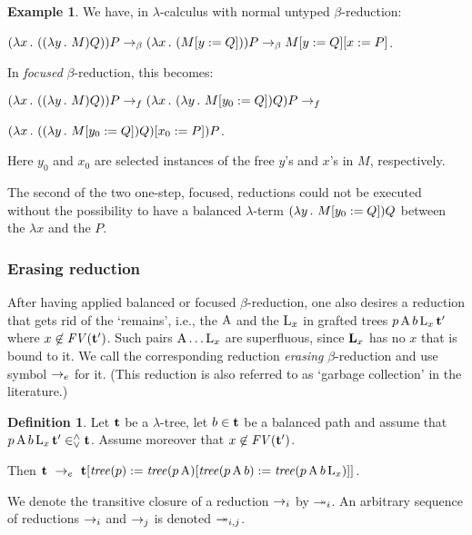 \documentclass{article}
\theoremstyle{plain}
\theoremstyle{definition}
\newtheorem{Def}[The]{Definition}
\newtheorem{Exa}[The]{Example}
\begin{document}
\begin{Exa}
We have, in $\lambda$-calculus with normal untyped $\beta$-reduction:

$(\lambda x  \, . \,\, ((\lambda y  \, . \,\, M) Q)) P \rightarrow_{\beta} (\lambda x  \, . \,\, (M[y := Q])) P \rightarrow_{\beta} M[y := Q][x := P]$.

In {\em focused\/} $\beta$-reduction, this becomes:

$(\lambda x \, . \,\, ((\lambda y  \, . \,\, M) Q)) P \rightarrow_f (\lambda x  \, . \,\, (\lambda y  \, . \,\, M[y_0 := Q])Q) P \rightarrow_f$

\mbox{$(\lambda x  \, . \,\, ((\lambda y  \, . \,\, M[y_0 := Q])Q)[x_0 := P])P$}.

Here $y_0$ and $x_0$ are selected instances of the free $y$'s and $x$'s in $M$, respectively.

The second of the two one-step, focused, reductions could not be executed without the possibility to have a balanced $\lambda$-term $(\lambda y  \, . \,\, M[y_0 := Q])Q$ between the $\lambda x$ and the $P$.

\end{Exa}


\subsubsection{Erasing reduction}

After having applied balanced or focused $\beta$-reduction, one also desires a reduction that gets rid of the `remains', i.e., the ${\rm A}$ and the ${\rm L}_x$ in grafted trees $p \, {\rm A} \, b \, {\rm L}_x \, {\bf t'}$ where $x \not \in {\it FV}({\bf t'})$. Such pairs ${\rm A} \ldots {\rm L}_x$ are superfluous, since ${\bf L}_x$ has no $x$ that is bound to it. We call the corresponding reduction {\em erasing\/} $\beta$-reduction and use symbol $\rightarrow_e$ for it. (This reduction is also referred to as `garbage collection' in the literature.)

\begin{Def}
Let ${\bf t}$ be a $\lambda$-tree, let $b \in {\bf t}$ be a balanced path and assume that $p \, {\rm A} \, b \, {\rm L}_x \, {\bf t'} \in^\wedge_\vee {\bf t}$. Assume moreover that $x \not\in {\it FV}({\bf t'})$.

Then ${\bf t} ~\rightarrow_e~ {\bf t}[{\it tree}(p) := {\it tree}(p \, {\rm A})[{\it tree} (p \, {\rm A} \, b) := {\it tree} (p \, {\rm A} \, b \, {\rm L}_x)]]$.
\end{Def}

We denote the transitive closure of a reduction $\rightarrow_i$ by $\twoheadrightarrow_i$. An arbitrary sequence of reductions $\rightarrow_i$ and $\rightarrow_j$ is denoted $\twoheadrightarrow_{i,j}$.
\end{document}

